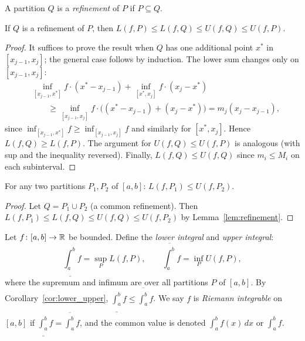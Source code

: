 \documentclass[11pt,a4paper]{article}
\begin{document}
\begin{definition}[Refinement]
\label{def:refinement}
A partition $Q$ is a \emph{refinement} of $P$ if $P \subseteq Q$.
\end{definition}

\begin{lemma}
\label{lem:refinement}
If $Q$ is a refinement of $P$, then
$L(f, P) \le L(f, Q) \le U(f, Q) \le U(f, P)$.
\end{lemma}

\begin{proof}
It suffices to prove the result when $Q$ has one additional point $x^*$
in $[x_{j-1}, x_j]$; the general case follows by induction. The lower
sum changes only on $[x_{j-1}, x_j]$:
\begin{align*}
  &\inf_{[x_{j-1}, x^*]} f \cdot (x^* - x_{j-1})
  + \inf_{[x^*, x_j]} f \cdot (x_j - x^*) \\
  &\qquad \ge \inf_{[x_{j-1}, x_j]} f \cdot
  \bigl((x^* - x_{j-1}) + (x_j - x^*)\bigr)
  = m_j(x_j - x_{j-1}),
\end{align*}
since $\inf_{[x_{j-1}, x^*]} f \ge \inf_{[x_{j-1}, x_j]} f$ and
similarly for $[x^*, x_j]$. Hence $L(f, Q) \ge L(f, P)$. The argument
for $U(f, Q) \le U(f, P)$ is analogous (with sup and the inequality
reversed). Finally, $L(f, Q) \le U(f, Q)$ since $m_i \le M_i$ on each
subinterval.
\end{proof}

\begin{corollary}
\label{cor:lower_upper}
For any two partitions $P_1, P_2$ of $[a, b]$:
$L(f, P_1) \le U(f, P_2)$.
\end{corollary}

\begin{proof}
Let $Q = P_1 \cup P_2$ (a common refinement). Then
$L(f, P_1) \le L(f, Q) \le U(f, Q) \le U(f, P_2)$
by Lemma~\ref{lem:refinement}.
\end{proof}

\begin{definition}
\label{def:riemann}
Let $f \colon [a, b] \to \mathbb{R}$ be bounded. Define the \emph{lower
integral} and \emph{upper integral}:
\[
  \underline{\int_a^b} f = \sup_P L(f, P), \qquad
  \overline{\int_a^b} f = \inf_P U(f, P),
\]
where the supremum and infimum are over all partitions $P$ of $[a, b]$.
By Corollary~\ref{cor:lower_upper},
$\underline{\int_a^b} f \le \overline{\int_a^b} f$.
We say $f$ is \emph{Riemann integrable} on $[a, b]$ if
$\underline{\int_a^b} f = \overline{\int_a^b} f$, and the common value
is denoted $\int_a^b f(x)\,dx$ or $\int_a^b f$.
\end{definition}
\end{document}
